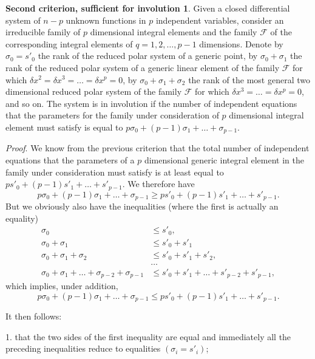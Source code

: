 \documentclass[leqno,11pt]{book}
\numberwithin{equation}{chapter}
\theoremstyle{shape1}
\theoremstyle{shape0}
\theoremstyle{shape2}
\theoremstyle{definition}
\begin{document}
\newtheorem*{inv2cri}{\hspace{15pt}Second criterion, sufficient for involution}
\begin{inv2cri}
  Given a closed differential system of $n-p$ unknown functions in $p$ independent variables, consider an irreducible family of $p$ dimensional integral elements and the family $\mathcal{F}$ of the corresponding integral elements of $q=1,2,\dots,p-1$ dimensions. Denote by $\sigma_{0}=s'_{0}$ the rank of the reduced polar system of a generic point, by $\sigma_{0}+\sigma_{1}$ the rank of the reduced polar system of a generic linear element of the family $\mathcal{F}$ for which $\delta x^{2}=\delta x^{3}=\dots=\delta x^{p}=0$, by $\sigma_{0}+\sigma_{1}+\sigma_{2}$ the rank of the most general two dimensional reduced polar system of the family $\mathcal{F}$ for which $\delta x^{3}=\dots =\delta x^{p}=0$, and so on. The system is in involution if the number of independent equations that the parameters for the family  under consideration of $p$ dimensional integral element must satisfy is equal to $p\sigma_{0}+(p-1)\sigma_{1}+\dots+\sigma_{p-1}$.
\end{inv2cri}

\vspace{12pt}\fsec \emph{Proof}. We know from the previous criterion that the total number of independent equations that the parameters of a $p$ dimensional generic integral element in the family under consideration must satisfy is at least equal to $ps'_{0}+(p-1)s'_{1}+\dots+s'_{p-1}$. We therefore have
\[
p\sigma_{0}+(p-1)\sigma_{1}+\dots+\sigma_{p-1}\ge ps'_{0}+(p-1)s'_{1}+\dots+s'_{p-1}.
\]
But we obviously also have the inequalities (where the first is actually an equality)
\begin{align*}
  \sigma_{0}&\le s'_{0},\\
  \sigma_{0}+\sigma_{1}&\le s'_{0}+s'_{1}\\
  \sigma_{0}+\sigma_{1}+\sigma_{2}&\le s'_{0}+s'_{1}+s'_{2},\\
  &\dots\\
  \sigma_{0}+\sigma_{1}+\dots+\sigma_{p-2}+\sigma_{p-1}&\le s'_{0}+s'_{1}+\dots+s'_{p-2}+s'_{p-1},
\end{align*}
which implies, under addition,
\[
p\sigma_{0}+(p-1)\sigma_{1}+\dots+\sigma_{p-1}\le ps'_{0}+(p-1)s'_{1}+\dots+s'_{p-1}.
\]

It then follows:

1. that the two sides of the first inequality are equal and immediately all the preceding inequalities reduce to equalities $(\sigma_{i}=s'_{i})$;
\end{document}
